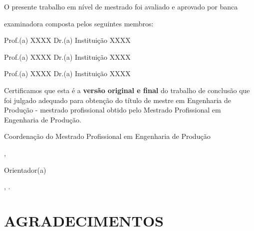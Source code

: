     O presente trabalho em nível de mestrado foi avaliado e aprovado por banca 
    
    examinadora composta pelos seguintes membros:

    \vspace{1cm}    
    Prof.(a) XXXX Dr.(a)
    Instituição XXXX
    
    \vspace{1cm}    
    Prof.(a) XXXX Dr.(a)
    Instituição XXXX
    
    \vspace{1cm}    
    Prof.(a) XXXX Dr.(a)
    Instituição XXXX
    
    \vspace{1cm}    
    \justifying \noindent \hspace{1.5cm} Certificamos que esta é a \textbf{versão original e final} do trabalho de conclusão que foi julgado adequado para obtenção do título de mestre em Engenharia de Produção - mestrado profissional obtido pelo Mestrado Profissional em Engenharia de Produção.

    \center
    \vspace{3cm}
    \hspace{2cm} \hrulefill \hspace{2cm}

    Coordenação do Mestrado Profissional em Engenharia de Produção

    \vspace{1cm}
    \hspace{2cm} \hrulefill \hspace{2cm}

    \Supervisor,

    Orientador(a)

    \null\vfil
    \Location, \Year.

    \pagebreak

    \null\vfil
    \begin{changemargin}{5cm}{0cm} 
        
    \end{changemargin}
    \pagebreak

    \center \fontsize{12}{14} \selectfont \section*{AGRADECIMENTOS}
    \justifying
    \hspace{1.5cm} 
    \pagebreak

